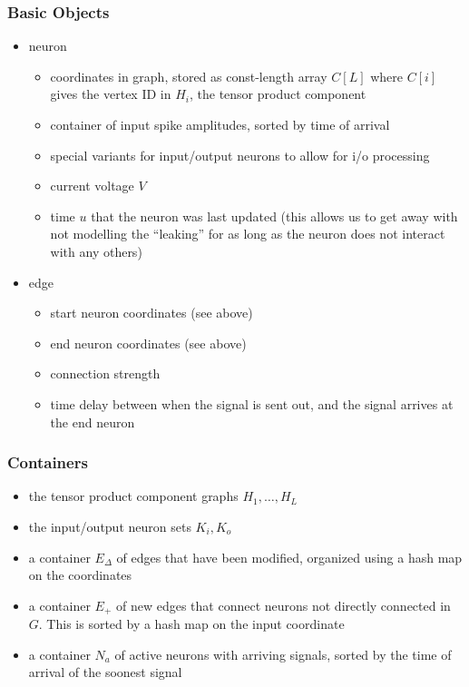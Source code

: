 \documentclass{article}
\begin{document}
\subsubsection{Basic Objects}
\begin{itemize}
    \item neuron
    \begin{itemize}
        \item coordinates in graph, stored as const-length array $C[L]$ where $C[i]$ gives the vertex ID in $H_i$, the tensor product component
        \item container of input spike amplitudes, sorted by time of arrival
        \item special variants for input/output neurons to allow for i/o processing
        \item current voltage $V$
        \item time $u$ that the neuron was last updated (this allows us to get away with not modelling the ``leaking'' for as long as the neuron does not interact with any others)
    \end{itemize}
    \item edge 
        \begin{itemize}
        \item start neuron coordinates (see above)
        \item end neuron coordinates (see above)
        \item connection strength
        \item time delay between when the signal is sent out, and the signal arrives at the end neuron
    \end{itemize}
\end{itemize}

\subsubsection{Containers}
\begin{itemize}
    \item the tensor product component graphs $H_1, \ldots, H_L$
    \item the input/output neuron sets $K_i, K_o$
    \item a container $E_\Delta$ of edges that have been modified, organized using a hash map on the coordinates
    \item a container $E_+$ of new edges that connect neurons not directly connected in $G$. This is sorted by a hash map on the input coordinate
    \item a container $N_a$ of active neurons with arriving signals, sorted by the time of arrival of the soonest signal
\end{itemize}
\end{document}
